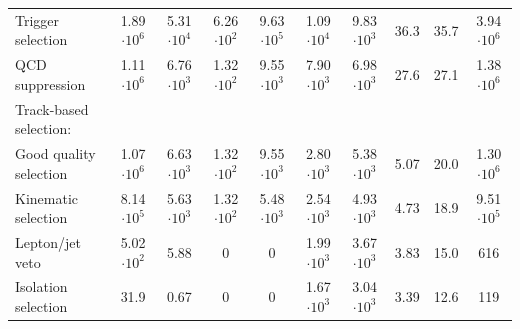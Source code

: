 \begin{table}
{\begin{tabular}{|l|c|c|c|c|c|c|c|c|c|}
Trigger selection                                                                         & 1.89 $\cdot10^{6 }$ & 5.31 $\cdot10^{4 }$ & 6.26 $\cdot10^{2 }$ & 9.63 $\cdot10^{5 }$ & 1.09 $\cdot10^{4 }$ & 9.83 $\cdot10^{3 }$ & 36.3 & 35.7 & 3.94 $\cdot10^{6 }$ \\
QCD suppression                                                                           & 1.11 $\cdot10^{6 }$ & 6.76 $\cdot10^{3 }$ & 1.32 $\cdot10^{2 }$ & 9.55 $\cdot10^{3 }$ & 7.90 $\cdot10^{3 }$ & 6.98 $\cdot10^{3 }$ & 27.6 & 27.1 & 1.38 $\cdot10^{6 }$ \\
Track-based selection:                                                                    
& & & & & & & & & \\
Good quality selection                                                                    & 1.07 $\cdot10^{6 }$ & 6.63 $\cdot10^{3 }$ & 1.32 $\cdot10^{2 }$ & 9.55 $\cdot10^{3 }$ & 2.80 $\cdot10^{3 }$ & 5.38 $\cdot10^{3 }$ & 5.07  & 20.0 & 1.30 $\cdot10^{6 }$ \\
Kinematic selection                                                                       & 8.14 $\cdot10^{5 }$ & 5.63 $\cdot10^{3 }$ & 1.32 $\cdot10^{2 }$ & 5.48 $\cdot10^{3 }$ & 2.54 $\cdot10^{3 }$ & 4.93 $\cdot10^{3 }$ & 4.73  & 18.9 & 9.51 $\cdot10^{5 }$ \\
Lepton/jet veto                                                                           & 5.02 $\cdot10^{2 }$ & 5.88  & 0  & 0  & 1.99 $\cdot10^{3 }$ & 3.67 $\cdot10^{3 }$ & 3.83  & 15.0  & 616 \\
Isolation selection                                                                       & 31.9  & 0.67  & 0  & 0  & 1.67 $\cdot10^{3 }$ & 3.04 $\cdot10^{3 }$ & 3.39  & 12.6  & 119  \\
\bottomrule
\end{tabular}}
\end{table}

